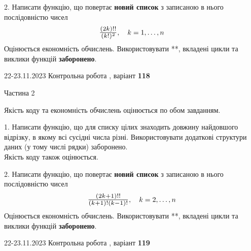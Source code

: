 \documentclass[12pt, ukrainian]{article}
\begin{document}
{{{{{{{{{{{{{{{{{\begin {Large}
\vspace{10mm}



2. 
Написати функцію, що повертає \textbf{новий список} з записаною в нього послідовністю чисел
$$\scalebox{1.2}{$\frac{(2k)!!}{(k!)^2}$}, \quad k=1,\ldots,n$$
Оцінюється економність обчислень. Використовувати **, вкладені цикли та виклики функцій \textbf{заборонено}.

\end{Large}\newpage




\begin {Huge}
{{22-23.11.2023 Контрольна робота , варіант  \No \textbf { 118 }\par}}

\begin{center}Частина 2
\end{center}
\vspace{10mm}
\end {Huge}

{
\begin {Large}
Якість коду та економність обчислень оцінюється по обом завданням.

\vspace{5mm}

1. Написати функцію, що для списку цілих знаходить довжину найдовшого відрізку, в якому всі сусідні числа різні. Використовувати додаткові структури даних (у тому числі рядки) заборонено.\\	Якість коду також оцінюється. 



\vspace{10mm}



2. 
Написати функцію, що повертає \textbf{новий список} з записаною в нього послідовністю чисел
$$\scalebox{1.2}{$\frac{(2k+1)!!}{(k+1)!(k-1)!}$}, \quad k=2,\ldots,n$$
Оцінюється економність обчислень. Використовувати **, вкладені цикли та виклики функцій \textbf{заборонено}.

\end{Large}\newpage




\begin {Huge}
{{22-23.11.2023 Контрольна робота , варіант  \No \textbf { 119 }\par}}


\end{Huge}}}}}}}}}}}}}}}}}}}
\end{document}
